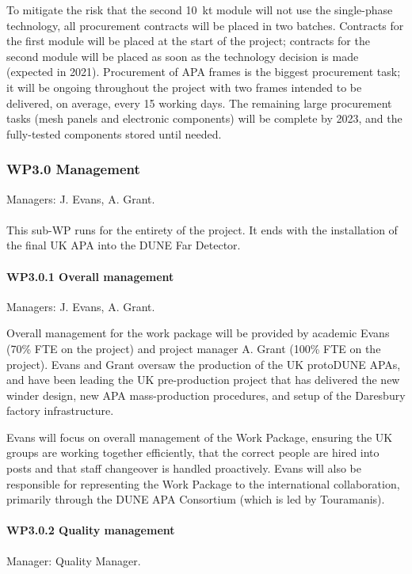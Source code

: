 To mitigate the risk that the second \SI{10}{\kilo\tonne} module will not use the single-phase technology, all procurement contracts will be placed in two batches. Contracts for the first module will be placed at the start of the project; contracts for the second module will be placed as soon as the technology decision is made (expected in 2021). Procurement of APA frames is the biggest procurement task; it will be ongoing throughout the project with two frames intended to be delivered, on average, every 15 working days.  The remaining large procurement tasks (mesh panels and electronic components) will be complete by 2023, and the fully-tested components stored until needed.

\subsubsection{WP3.0 Management}

Managers: J. Evans, A. Grant.\\
\\This sub-WP runs for the entirety of the project. It ends with the installation of the final UK APA into the DUNE Far Detector.

\paragraph{WP3.0.1 Overall management} Managers: J. Evans, A. Grant.

Overall management for the work package will be provided by academic Evans (70\% FTE on the project) and project manager A. Grant (100\% FTE on the project). Evans and Grant oversaw the production of the UK protoDUNE APAs, and have been leading the UK pre-production project that has delivered the new winder design, new APA mass-production procedures, and setup of the Daresbury factory infrastructure. 

Evans will focus on overall management of the Work Package, ensuring the UK groups are working together efficiently, that the correct people are hired into posts and that staff changeover is handled proactively. Evans will also be responsible for representing the Work Package to the international collaboration, primarily through the DUNE APA Consortium (which is led by Touramanis).

\paragraph{WP3.0.2 Quality management} Manager: Quality Manager.

